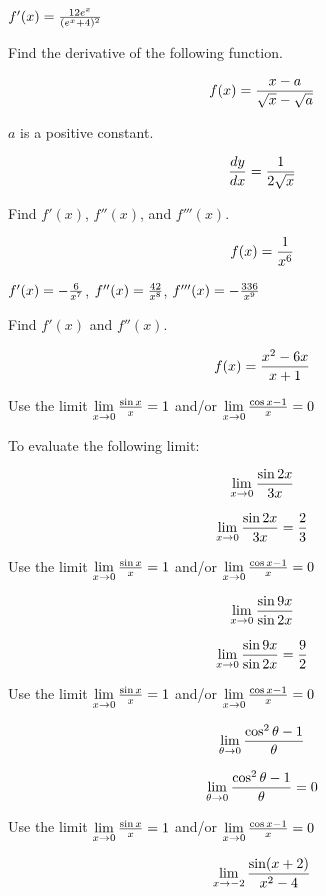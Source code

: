 $f'(x) = {12e^x \over (e^x + 4)^2}$
\bigskip

Find the derivative of the following function.

$$\
f(x) = {x - a \over \sqrt{x} - \sqrt{a}}
$$

$a$ is a positive constant.

$$\
{dy \over dx} = {1 \over 2 \sqrt{x}}
$$
\bigskip

Find $f'(x)$, $f''(x)$, and $f'''(x)$.

$$\
f(x) = {1 \over x^6}
$$


$f'(x) = - {6 \over x^7}$, $f''(x) = {42 \over x^8}$,
$f'''(x) = -{336 \over x^9}$
\bigskip

Find $f'(x)$ and $f''(x)$.

$$\
f(x) = {x^2 - 6x \over x + 1}
$$

Use the limit
$\lim\limits_{x \to 0} {\sin x \over x} = 1$
and/or
$\lim\limits_{x \to 0} {\cos x - 1 \over x} = 0$

To evaluate the following limit:

$$\
\lim_{x \to 0} {\sin 2x \over 3x}
$$

$$\
\lim_{x \to 0} {\sin 2x \over 3x} = {2 \over 3}
$$

\bigskip

Use the limit
$\lim\limits_{x \to 0} {\sin x \over x} = 1$
and/or
$\lim\limits_{x \to 0} {\cos x - 1 \over x} = 0$

$$\
\lim_{x \to 0} {\sin 9x \over \sin 2x}
$$

$$\
\lim_{x \to 0} {\sin 9x \over \sin 2x} = {9 \over 2}
$$

\bigskip

Use the limit
$\lim\limits_{x \to 0} {\sin x \over x} = 1$
and/or
$\lim\limits_{x \to 0} {\cos x - 1 \over x} = 0$

$$\
\lim_{\theta \to 0}{\cos^2\theta - 1 \over \theta}
$$

$$\
\lim_{\theta \to 0}{\cos^2\theta - 1 \over \theta} = 0
$$

\bigskip

\problem{3.5.19}
Use the limit
$\lim\limits_{x \to 0} {\sin x \over x} = 1$
and/or
$\lim\limits_{x \to 0} {\cos x - 1 \over x} = 0$

$$\
\lim_{x \to -2}{
\sin(x + 2)
\over
x^2 - 4
}
$$


